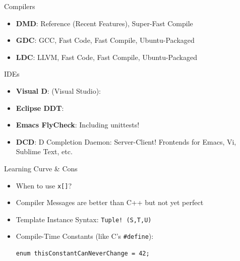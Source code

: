 \documentclass[xcolor=dvipsnames]{beamer}
\begin{document}
\begin{frame}[fragile]{Compilers}
  \begin{itemize}[<+->]
  \item \textbf{DMD}: Reference (Recent Features), Super-Fast Compile
  \item \textbf{GDC}: GCC, Fast Code, Fast Compile, Ubuntu-Packaged
  \item \textbf{LDC}: LLVM, Fast Code, Fast Compile, Ubuntu-Packaged
  \end{itemize}
\end{frame}

\begin{frame}[fragile]{IDEs}
  \begin{itemize}[<+->]
  \item \textbf{Visual D}: (Visual Studio):
  \item \textbf{Eclipse DDT}:
  \item \textbf{Emacs FlyCheck}: Including unittests!
  \item \textbf{DCD}: D Completion Daemon: Server-Client! Frontends for Emacs,
    Vi, Sublime Text, etc.
  \end{itemize}
\end{frame}

\begin{frame}[fragile]{Learning Curve \& Cons}
  \begin{itemize}[<+->]
  \item When to use \texttt{x[]}?
  \item Compiler Messages are better than C++ but not yet perfect
  \item Template Instance Syntax: \texttt{Tuple! (S,T,U)}
  \item Compile-Time Constants (like C's \texttt{#define}):
\begin{lstlisting}[frame=single]
  enum thisConstantCanNeverChange = 42;
\end{lstlisting}
  \end{itemize}
\end{frame}
\end{document}
